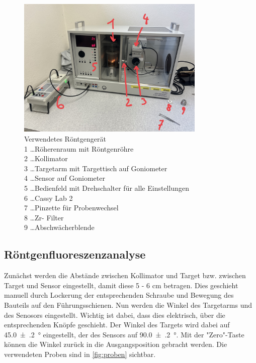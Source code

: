 \documentclass[12pt,english,ngerman]{scrartcl}
\begin{document}
\begin{figure}[H]
	\begin{center}
		\includegraphics[width =0.8\textwidth]{./figures/aufbau.jpg}
	\end{center}
	\caption[Verwendetes Röntgengerät] {Verwendetes Röntgengerät                                   \\
		1 \dots Röherenraum mit Röntgenröhre                       \\
		2 \dots Kollimator                                         \\
		3 \dots Targetarm mit Targettisch auf Goniometer           \\
		4 \dots Sensor auf Goniometer                              \\
		5 \dots Bedienfeld mit Drehschalter für alle Einstellungen \\
		6 \dots Cassy Lab 2                                        \\
		7 \dots Pinzette für Probenwechsel                         \\
		8 \dots Zr- Filter                                         \\
		9 \dots Abschwächerblende
	}\label{fig:aufabau}
\end{figure}

\subsection{Röntgenfluoreszenzanalyse}

Zunächst werden die Abstände zwischen Kollimator und Target bzw. zwischen
Target und Sensor eingestellt, damit diese 5 - 6 cm betragen. Dies geschieht
manuell durch Lockerung der entsprechenden Schraube und Bewegung des Bauteils
auf den Führungsschienen. Nun werden die Winkel des Targetarms und des Senosors
eingestellt. Wichtig ist dabei, dass dies elektrisch, über die entsprechenden
Knöpfe geschieht. Der Winkel des Targets wird dabei auf \SI{45.0(2)}{\degree}
eingestellt, der des Sensors auf \SI{90.0(2)}{\degree}. Mit der "Zero"-Taste
können die Winkel zurück in die Ausgangsposition gebracht werden. Die
verwendeten Proben sind in \autoref{fig:proben} sichtbar.
\end{document}
